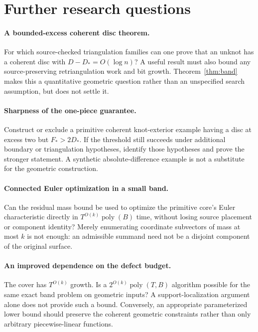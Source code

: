 \documentclass[11pt,letterpaper]{article}
\theoremstyle{definition}
\newcommand{\poly}{\operatorname{poly}}
\begin{document}
\section{Further research questions}\label{sec:future}
\paragraph{A bounded-excess coherent disc theorem.}
For which source-checked triangulation families can one prove that an unknot has a coherent disc with $D-D_*=O(\log n)$? A useful result must also bound any source-preserving retriangulation work and bit growth. Theorem~\ref{thm:band} makes this a quantitative geometric question rather than an unspecified search assumption, but does not settle it.

\paragraph{Sharpness of the one-piece guarantee.}
Construct or exclude a primitive coherent knot-exterior example having a disc at excess two but $F_*>2D_*$. If the threshold still succeeds under additional boundary or triangulation hypotheses, identify those hypotheses and prove the stronger statement. A synthetic absolute-difference example is not a substitute for the geometric construction.

\paragraph{Connected Euler optimization in a small band.}
Can the residual mass bound be used to optimize the primitive core's Euler characteristic directly in $T^{O(k)}\poly(B)$ time, without losing source placement or component identity? Merely enumerating coordinate subvectors of mass at most $k$ is not enough: an admissible summand need not be a disjoint component of the original surface.

\paragraph{An improved dependence on the defect budget.}
The cover has $T^{O(k)}$ growth. Is a $2^{O(k)}\poly(T,B)$ algorithm possible for the same exact band problem on geometric inputs? A support-localization argument alone does not provide such a bound. Conversely, an appropriate parameterized lower bound should preserve the coherent geometric constraints rather than only arbitrary piecewise-linear functions.
\end{document}
